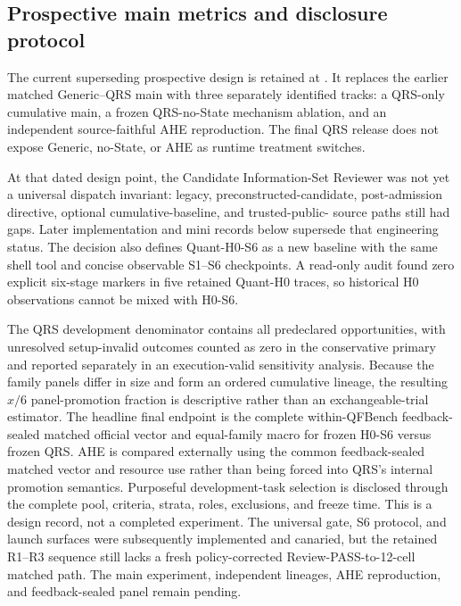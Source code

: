 \subsection{Prospective main metrics and disclosure protocol}

The current superseding prospective design is retained at
.
It replaces the earlier matched Generic--QRS main with three separately
identified tracks: a QRS-only cumulative main, a frozen QRS-no-State mechanism
ablation, and an independent source-faithful AHE reproduction. The final QRS
release does not expose Generic, no-State, or AHE as runtime treatment switches.

At that dated design point, the Candidate Information-Set Reviewer was not yet
a universal dispatch invariant: legacy, preconstructed-candidate,
post-admission directive, optional cumulative-baseline, and trusted-public-
source paths still had gaps. Later implementation and mini records below
supersede that engineering status. The decision also defines Quant-H0-S6 as a new
baseline with the same shell tool and concise observable S1--S6 checkpoints. A
read-only audit found zero explicit six-stage markers in five retained
Quant-H0 traces, so historical H0 observations cannot be mixed with H0-S6.

The QRS development denominator contains all predeclared opportunities, with
unresolved setup-invalid outcomes counted as zero in the conservative primary
and reported separately in an execution-valid sensitivity analysis. Because
the family panels differ in size and form an ordered cumulative lineage, the
resulting $x/6$ panel-promotion fraction is descriptive rather than an
exchangeable-trial estimator. The headline final endpoint is the complete
within-QFBench feedback-sealed matched official vector and equal-family macro
for frozen H0-S6 versus frozen QRS. AHE is compared externally using the common
feedback-sealed matched vector and resource use rather than being forced into
QRS's internal promotion semantics. Purposeful development-task selection is
disclosed through the complete pool, criteria, strata, roles, exclusions, and
freeze time. This is a design record, not a completed experiment. The universal
gate, S6 protocol, and launch surfaces were subsequently implemented and
canaried, but the retained R1--R3 sequence still lacks a fresh
policy-corrected Review-PASS-to-12-cell matched path. The main experiment,
independent lineages, AHE reproduction, and feedback-sealed panel remain
pending.

